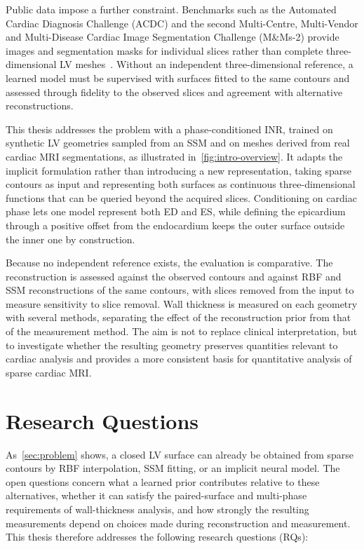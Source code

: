 Public data impose a further constraint. Benchmarks such as the Automated
Cardiac Diagnosis Challenge (ACDC) and the second Multi-Centre, Multi-Vendor
and Multi-Disease Cardiac Image Segmentation Challenge (M\&Ms-2) provide images
and segmentation masks for individual slices rather than complete
three-dimensional LV meshes~\parencite{bernard2018acdc,martinisla2023mnms2}.
Without an independent three-dimensional reference, a learned model must be
supervised with surfaces fitted to the same contours and assessed through
fidelity to the observed slices and agreement with alternative reconstructions.

This thesis addresses the problem with a phase-conditioned INR, trained on
synthetic LV geometries sampled from an SSM and on meshes derived from real
cardiac MRI segmentations, as illustrated in~\cref{fig:intro-overview}.
It adapts the implicit formulation rather than introducing a new
representation, taking sparse contours as input and representing both surfaces
as continuous three-dimensional functions that can be queried beyond the
acquired slices. Conditioning on cardiac phase lets one model represent both
ED and ES, while defining the epicardium through a positive offset from the
endocardium keeps the outer surface outside the inner one by construction.

Because no independent reference exists, the evaluation is comparative. The
reconstruction is assessed against the observed contours and against RBF and
SSM reconstructions of the same contours, with slices removed from the input to
measure sensitivity to slice removal. Wall thickness is measured on each
geometry with several methods, separating the effect of the reconstruction
prior from that of the measurement method. The aim is not to replace clinical
interpretation, but to investigate whether the resulting geometry preserves
quantities relevant to cardiac analysis and provides a more consistent basis
for quantitative analysis of sparse cardiac MRI.

\section{Research Questions}
\label{sec:research-questions}
\noindent
As~\cref{sec:problem} shows, a closed LV surface can already be obtained from
sparse contours by RBF interpolation, SSM fitting, or an implicit neural model.
The open questions concern what a learned prior contributes relative to these
alternatives, whether it can satisfy the paired-surface and multi-phase
requirements of wall-thickness analysis, and how strongly the resulting
measurements depend on choices made during reconstruction and measurement.
This thesis therefore addresses the following research questions (RQs):

